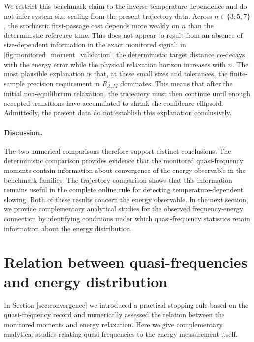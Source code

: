 \documentclass[showpacs,amsmath,amssymb,twocolumn,prx,superscriptaddress,10pt,aps,nofootinbib]{revtex4-2}
\begin{document}
We restrict this benchmark claim to the inverse-temperature dependence and do not infer system-size scaling from the present trajectory data. Across $n\in\{3,5,7\}$, the stochastic first-passage cost depends more weakly on $n$ than the deterministic reference time. This does not appear to result from an absence of size-dependent information in the exact monitored signal: in \autoref{fig:monitored_moment_validation}, the deterministic target distance co-decays with the energy error while the physical relaxation horizon increases with $n$. The most plausible explanation is that, at these small sizes and tolerances, the finite-sample precision requirement in $R_{\Lambda,M}$ dominates. This means that after the initial non-equilibrium relaxation, the trajectory must then continue until enough accepted transitions have accumulated to shrink the confidence ellipsoid. Admittedly, the present data do not establish this explanation conclusively.

\paragraph{Discussion.} The two numerical comparisons therefore support distinct conclusions. The deterministic comparison provides evidence that the monitored quasi-frequency moments contain information about convergence of the energy observable in the benchmark families. The trajectory comparison shows that this information remains useful in the complete online rule for detecting temperature-dependent slowing. Both of these results concern the energy observable. In the next section, we provide complementary analytical studies for the observed frequency-energy connection by identifying conditions under which quasi-frequency statistics retain information about the energy distribution.


\section{Relation between quasi-frequencies and energy distribution}
\label{sec:one-designs}

In Section \ref{sec:convergence} we introduced a practical stopping rule based on the quasi-frequency record and numerically assessed the relation between the monitored moments and energy relaxation. Here we give complementary analytical studies relating quasi-frequencies to the energy measurement itself. 
\end{document}
